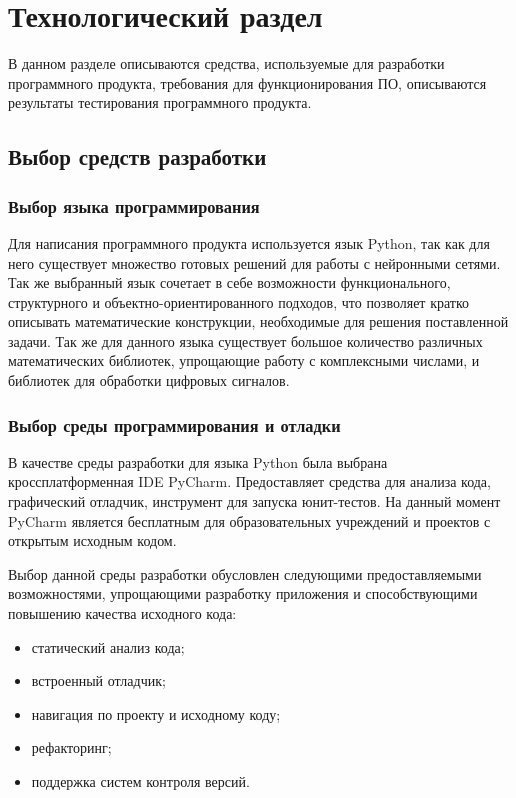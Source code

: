 \chapter{Технологический раздел}
\label{cha:impl}

В данном разделе описываются средства, используемые для разработки программного продукта, требования для функционирования ПО, описываются результаты тестирования программного продукта.

\section{Выбор средств разработки}

\subsection{Выбор языка программирования}

Для написания программного продукта используется язык Python, так как для него существует множество готовых решений для работы с нейронными сетями. Так же выбранный язык сочетает в себе возможности функционального, структурного и объектно-ориентированного подходов, что позволяет кратко описывать математические конструкции, необходимые для решения поставленной задачи. Так же для данного языка существует большое количество различных математических библиотек, упрощающие работу с комплексными числами, и библиотек для обработки цифровых сигналов.

\subsection{Выбор среды программирования и отладки}

В качестве среды разработки для языка Python была выбрана кроссплатформенная IDE PyCharm. Предоставляет средства для анализа кода, графический отладчик, инструмент для запуска юнит-тестов. На данный момент PyCharm является бесплатным для образовательных учреждений и проектов с открытым исходным кодом.

Выбор данной среды разработки обусловлен следующими предоставляемыми возможностями, упрощающими разработку приложения и способствующими повышению качества исходного кода:

\begin{itemize}
	\item статический анализ кода;
	\item встроенный отладчик;
	\item навигация по проекту и исходному коду;
	\item рефакторинг;
	\item поддержка систем контроля версий.
\end{itemize}

